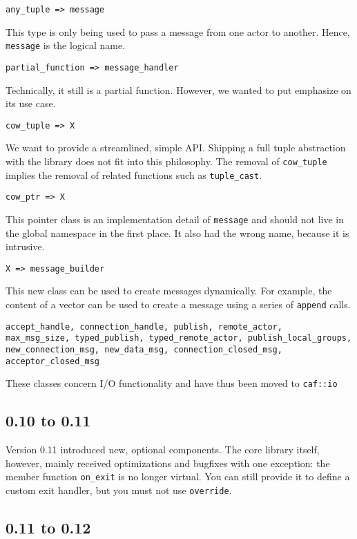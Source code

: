 \lstinline^any_tuple => message^

This type is only being used to pass a message from one actor to another. Hence, \lstinline^message^ is the logical name.

\lstinline^partial_function => message_handler^

Technically, it still is a partial function. However, we wanted to put emphasize on its use case.

\lstinline^cow_tuple => X^

We want to provide a streamlined, simple API. Shipping a full tuple abstraction with the library does not fit into this philosophy. The removal of \lstinline^cow_tuple^ implies the removal of related functions such as \lstinline^tuple_cast^.

\lstinline^cow_ptr => X^

This pointer class is an implementation detail of \lstinline^message^ and should not live in the global namespace in the first place. It also had the wrong name, because it is intrusive.

\lstinline^X => message_builder^

This new class can be used to create messages dynamically. For example, the content of a vector can be used to create a message using a series of \lstinline^append^ calls.


\begin{lstlisting}
accept_handle, connection_handle, publish, remote_actor,
max_msg_size, typed_publish, typed_remote_actor, publish_local_groups,
new_connection_msg, new_data_msg, connection_closed_msg, acceptor_closed_msg
\end{lstlisting}

These classes concern I/O functionality and have thus been moved to \lstinline^caf::io^

\subsection{0.10 to 0.11}

Version 0.11 introduced new, optional components.
The core library itself, however, mainly received optimizations and bugfixes with one exception: the member function \lstinline^on_exit^ is no longer virtual.
You can still provide it to define a custom exit handler, but you must not use \lstinline^override^.

\subsection{0.11 to 0.12}

